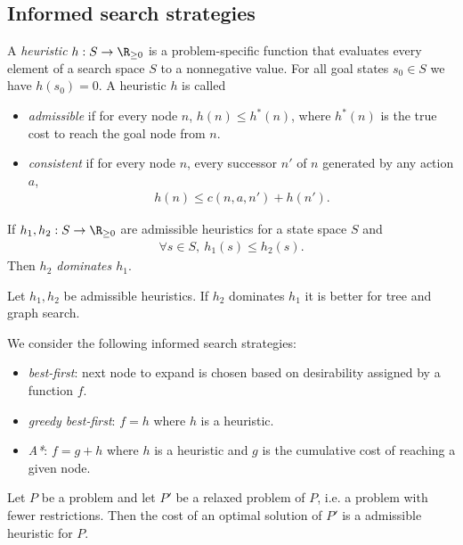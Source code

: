 \documentclass{article}
\begin{document}
\subsection{Informed search strategies}

\begin{definition}[R\&N p. 92]
	A \emph{heuristic} $h:S\to \R_{\geq 0}$ is a problem-specific function
	that evaluates every element of a search space $S$ to a nonnegative value.
	For all goal states $s_0\in S$ we have $h(s_0)=0$.
	A heuristic $h$ is called
	\begin{itemize}
		\item \emph{admissible} if for every node $n$, $h(n)\leq h^*(n)$,
		      where $h^*(n)$ is the true cost to reach the goal node from $n$.
		\item \emph{consistent} if for every node $n$, every
		      successor $n'$ of $n$ generated by any action $a$,
		      \begin{align*}
			      h(n) \leq c(n, a, n') + h(n').
		      \end{align*}
	\end{itemize}
	If $h_1,h_2:S\to \R_{\geq 0}$ are admissible heuristics for a state
	space $S$ and
	\begin{align*}
		\forall s\in S,\: h_1(s) \leq h_2(s).
	\end{align*}
	Then \emph{$h_2$ dominates $h_1$}.
\end{definition}

\begin{theorem}
	Let $h_1,h_2$ be admissible heuristics. If $h_2$ dominates $h_1$ it is
	better for tree and graph search.
\end{theorem}

\begin{definition}
	We consider the following informed search strategies:
	\begin{itemize}
		\item \emph{best-first}: next node to expand is chosen based on desirability assigned by a function $f$.
		\item \emph{greedy best-first}: $f=h$ where $h$ is a heuristic.
		\item \emph{A*}: $f=g+h$ where $h$ is a heuristic and $g$ is the cumulative cost of reaching a given node.
	\end{itemize}
\end{definition}

\begin{theorem}
	Let $P$ be a problem and let $P'$ be a relaxed problem of $P$, i.e.
	a problem with fewer restrictions. Then the cost of an optimal solution of
	$P'$ is a admissible heuristic for $P$.
\end{theorem}
\end{document}
